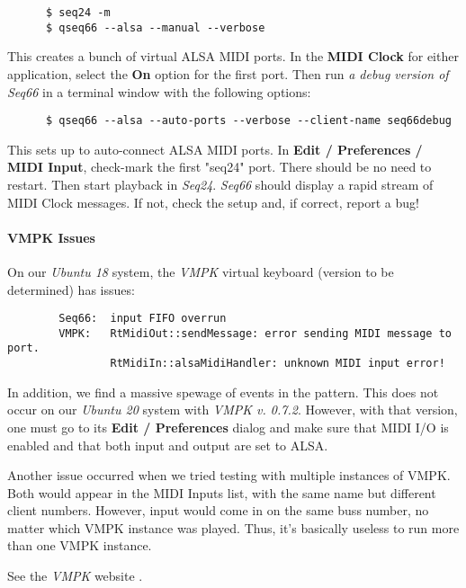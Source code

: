    \begin{verbatim}
      $ seq24 -m
      $ qseq66 --alsa --manual --verbose
   \end{verbatim}

   This creates a bunch of virtual ALSA MIDI ports.
   In the \textbf{MIDI Clock} for either application,
   select the \textbf{On} option for the first port.
   Then run \textsl{a debug version of Seq66} in a terminal window
   with the following options:

   \begin{verbatim}
      $ qseq66 --alsa --auto-ports --verbose --client-name seq66debug
   \end{verbatim}

   This sets up to auto-connect ALSA MIDI ports.  In
   \textbf{Edit / Preferences / MIDI Input}, check-mark the first
   "seq24" port.  There should be no need to restart.
   Then start playback in \textsl{Seq24}.
   \textsl{Seq66} should display a rapid stream of MIDI Clock messages.
   If not, check the setup and, if correct, report a bug!

\paragraph{VMPK Issues}
\label{paragraph:alsa_testing_vmpk_issues}

   On our \textsl{Ubuntu 18} system, the \textsl{VMPK} virtual keyboard
   (version to be determined) has issues:

   \begin{verbatim}
        Seq66:  input FIFO overrun
        VMPK:   RtMidiOut::sendMessage: error sending MIDI message to port.
                RtMidiIn::alsaMidiHandler: unknown MIDI input error!
   \end{verbatim}

   In addition, we find a massive spewage of events in the pattern.
   This does not occur on our \textsl{Ubuntu 20} system with
   \textsl{VMPK v. 0.7.2}.
   However, with that version, one must go to its \textbf{Edit / Preferences}
   dialog and make sure that MIDI I/O is enabled and that both input
   and output are set to ALSA.

   Another issue occurred when we tried testing with multiple instances
   of VMPK. Both would appear in the MIDI Inputs list, with the same name but
   different client numbers.  However, input would come in on the same buss
   number, no matter which VMPK instance was played.
   Thus, it's basically useless to run more than one VMPK instance.

   See the \textsl{VMPK} website \cite{vmpk}.

